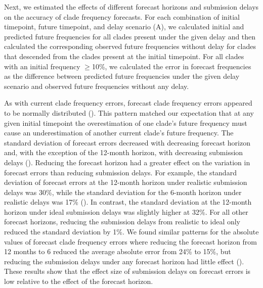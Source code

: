 \documentclass[9pt,lineno]{elife}
\begin{document}
Next, we estimated the effects of different forecast horizons and submission delays on the accuracy of clade frequency forecasts.
For each combination of initial timepoint, future timepoint, and delay scenario (A), we calculated initial and predicted future frequencies for all clades present under the given delay and then calculated the corresponding observed future frequencies without delay for clades that descended from the clades present at the initial timepoint.
For all clades with an initial frequency $\ge$10\%, we calculated the error in forecast frequencies as the difference between predicted future frequencies under the given delay scenario and observed future frequencies without any delay.

As with current clade frequency errors, forecast clade frequency errors appeared to be normally distributed ().
This pattern matched our expectation that at any given initial timepoint the overestimation of one clade's future frequency must cause an underestimation of another current clade's future frequency.
The standard deviation of forecast errors decreased with decreasing forecast horizon and, with the exception of the 12-month horizon, with decreasing submission delays ().
Reducing the forecast horizon had a greater effect on the variation in forecast errors than reducing submission delays.
For example, the standard deviation of forecast errors at the 12-month horizon under realistic submission delays was 30\%, while the standard deviation for the 6-month horizon under realistic delays was 17\% ().
In contrast, the standard deviation at the 12-month horizon under ideal submission delays was slightly higher at 32\%.
For all other forecast horizons, reducing the submission delays from realistic to ideal only reduced the standard deviation by 1\%.
We found similar patterns for the absolute values of forecast clade frequency errors where reducing the forecast horizon from 12 months to 6 reduced the average absolute error from 24\% to 15\%, but reducing the submission delays under any forecast horizon had little effect ().
These results show that the effect size of submission delays on forecast errors is low relative to the effect of the forecast horizon.
\end{document}
